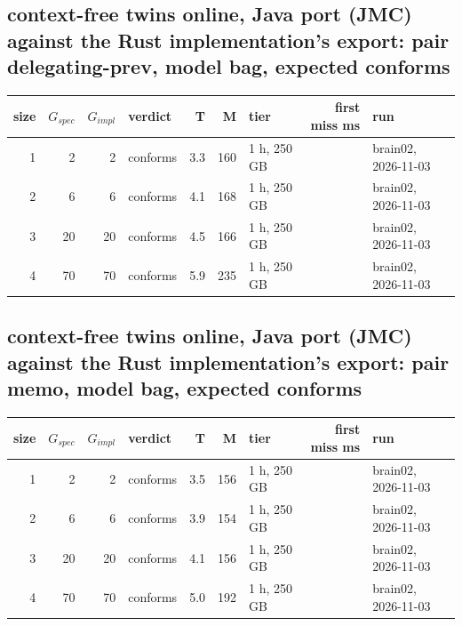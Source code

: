 \documentclass[10pt]{article}
\begin{document}
\subsection*{context-free twins online, Java port (JMC) against the Rust implementation's export: pair \textsf{delegating-prev}, model bag, expected conforms}
\begin{longtable}{@{}rrrlrrlrl@{}}
\toprule
size & $G_{\mathit{spec}}$ & $G_{\mathit{impl}}$ & verdict & T & M & tier & first miss ms & run \\
\midrule
\endhead
\color{red} 1 & 2 & 2 & conforms & 3.3 & 160 & 1 h, 250 GB &  & brain02, 2026-11-03 \\
\color{red} 2 & 6 & 6 & conforms & 4.1 & 168 & 1 h, 250 GB &  & brain02, 2026-11-03 \\
\color{red} 3 & 20 & 20 & conforms & 4.5 & 166 & 1 h, 250 GB &  & brain02, 2026-11-03 \\
\color{red} 4 & 70 & 70 & conforms & 5.9 & 235 & 1 h, 250 GB &  & brain02, 2026-11-03 \\
\bottomrule
\end{longtable}
\subsection*{context-free twins online, Java port (JMC) against the Rust implementation's export: pair \textsf{memo}, model bag, expected conforms}
\begin{longtable}{@{}rrrlrrlrl@{}}
\toprule
size & $G_{\mathit{spec}}$ & $G_{\mathit{impl}}$ & verdict & T & M & tier & first miss ms & run \\
\midrule
\endhead
\color{red} 1 & 2 & 2 & conforms & 3.5 & 156 & 1 h, 250 GB &  & brain02, 2026-11-03 \\
\color{red} 2 & 6 & 6 & conforms & 3.9 & 154 & 1 h, 250 GB &  & brain02, 2026-11-03 \\
\color{red} 3 & 20 & 20 & conforms & 4.1 & 156 & 1 h, 250 GB &  & brain02, 2026-11-03 \\
\color{red} 4 & 70 & 70 & conforms & 5.0 & 192 & 1 h, 250 GB &  & brain02, 2026-11-03 \\
\bottomrule
\end{longtable}
\end{document}
